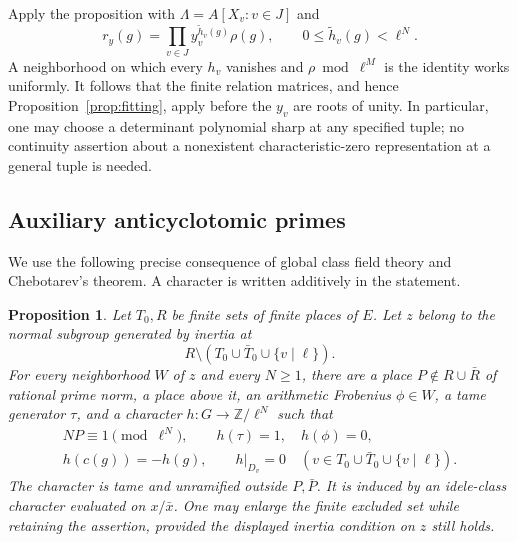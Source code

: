 \documentclass[11pt,a4paper]{article}
\newtheorem{proposition}[theorem]{Proposition}
\theoremstyle{definition}
\newcommand{\Z}{\mathbb Z}
\begin{document}
Apply the proposition with
\(\Lambda=A[X_v:v\in J]\) and
\[
 r_y(g)=\prod_{v\in J}y_v^{\widetilde h_v(g)}\rho(g),
 \qquad 0\le\widetilde h_v(g)<\ell^N.
\]
A neighborhood on which every \(h_v\) vanishes and
\(\rho\bmod\ell^M\) is the identity works uniformly.
It follows that the finite relation matrices, and hence
Proposition~\ref{prop:fitting}, apply before the \(y_v\) are
roots of unity. In particular, one may choose a determinant
polynomial sharp at any specified tuple; no continuity
assertion about a nonexistent characteristic-zero
representation at a general tuple is needed.

\subsection{Auxiliary anticyclotomic primes}
We use the following precise consequence of global class field
theory and Chebotarev's theorem. A character is written
additively in the statement.
\begin{proposition}\label{prop:auxiliary-prime}
Let \(T_0,R\) be finite sets of finite places of \(E\).
Let \(z\) belong to the normal subgroup generated by inertia at
\[
 R\setminus(T_0\cup\bar T_0\cup\{v\mid\ell\}).
\]
For every neighborhood \(W\) of \(z\) and every \(N\ge1\),
there are a place \(P\notin R\cup\bar R\) of rational prime
norm, a place above it, an arithmetic Frobenius \(\phi\in W\),
a tame generator \(\tau\), and a character
\(h:G\to\Z/\ell^N\) such that
\[
 \begin{gathered}
 NP\equiv1\pmod{\ell^N},\qquad h(\tau)=1,\quad h(\phi)=0,\\
 h(c(g))=-h(g),\qquad
 h|_{D_v}=0\quad(v\in T_0\cup\bar T_0\cup\{v\mid\ell\}).
 \end{gathered}
\]
The character is tame and unramified outside \(P,\bar P\).
It is induced by an idele-class character evaluated on
\(x/\bar x\).
One may enlarge the finite excluded set while retaining the
assertion, provided the displayed inertia condition on \(z\)
still holds.
\end{proposition}
\end{document}
